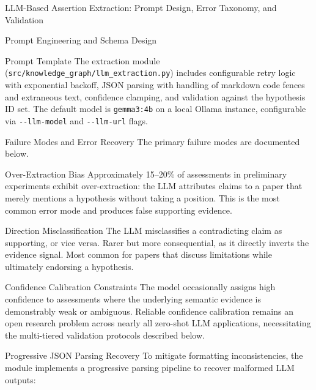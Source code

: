 \documentclass[
  ignorenonframetext,
]{beamer}
\begin{document}
\begin{frame}[fragile]{LLM-Based Assertion Extraction: Prompt Design,
Error Taxonomy, and Validation \label{sec:extraction_pipeline}}
\begin{block}{Prompt Engineering and Schema Design}
\begin{block}{Prompt Template}
The extraction module (\texttt{src/knowledge\_graph/llm\_extraction.py})
includes configurable retry logic with exponential backoff, JSON parsing
with handling of markdown code fences and extraneous text, confidence
clamping, and validation against the hypothesis ID set. The default
model is \texttt{gemma3:4b} on a local Ollama instance, configurable via
\texttt{-\/-llm-model} and \texttt{-\/-llm-url} flags.
\end{block}
\end{block}

\begin{block}{Failure Modes and Error Recovery}
\protect{}\label{failure-modes-and-error-recovery}
The primary failure modes are documented below.

\begin{block}{Over-Extraction Bias}
\protect{}\label{over-extraction-bias}
Approximately 15--20\% of assessments in preliminary experiments exhibit
over-extraction: the LLM attributes claims to a paper that merely
mentions a hypothesis without taking a position. This is the most common
error mode and produces false supporting evidence.
\end{block}

\begin{block}{Direction Misclassification}
\protect{}\label{direction-misclassification}
The LLM misclassifies a contradicting claim as supporting, or vice
versa. Rarer but more consequential, as it directly inverts the evidence
signal. Most common for papers that discuss limitations while ultimately
endorsing a hypothesis.
\end{block}

\begin{block}{Confidence Calibration Constraints}
\protect{}\label{confidence-calibration-constraints}
The model occasionally assigns high confidence to assessments where the
underlying semantic evidence is demonstrably weak or ambiguous. Reliable
confidence calibration remains an open research problem across nearly
all zero-shot LLM applications, necessitating the multi-tiered
validation protocols described below.
\end{block}

\begin{block}{Progressive JSON Parsing Recovery}
\protect{}\label{progressive-json-parsing-recovery}
To mitigate formatting inconsistencies, the module implements a
progressive parsing pipeline to recover malformed LLM outputs:


\end{block}
\end{block}
\end{frame}
\end{document}
